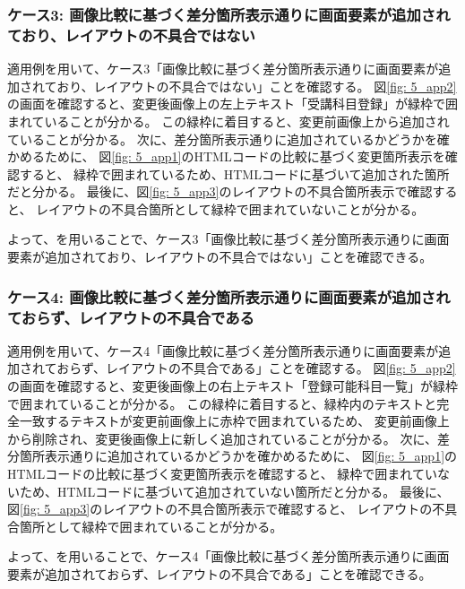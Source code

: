 \subsubsection*{ケース3: 画像比較に基づく差分箇所表示通りに画面要素が追加されており、レイアウトの不具合ではない}\label{sec:result_area3}
適用例を用いて、ケース3「画像比較に基づく差分箇所表示通りに画面要素が追加されており、レイアウトの不具合ではない」ことを確認する。
図\ref{fig: 5_app2}の画面を確認すると、変更後画像上の左上テキスト「受講科目登録」が緑枠で囲まれていることが分かる。
この緑枠に着目すると、変更前画像上から追加されていることが分かる。
次に、差分箇所表示通りに追加されているかどうかを確かめるために、
図\ref{fig: 5_app1}のHTMLコードの比較に基づく変更箇所表示を確認すると、
緑枠で囲まれているため、HTMLコードに基づいて追加された箇所だと分かる。
最後に、図\ref{fig: 5_app3}のレイアウトの不具合箇所表示で確認すると、
レイアウトの不具合箇所として緑枠で囲まれていないことが分かる。
\par
よって、\toolName を用いることで、ケース3「画像比較に基づく差分箇所表示通りに画面要素が追加されており、レイアウトの不具合ではない」ことを確認できる。


\subsubsection*{ケース4: 画像比較に基づく差分箇所表示通りに画面要素が追加されておらず、レイアウトの不具合である}\label{sec:result_area4}
適用例を用いて、ケース4「画像比較に基づく差分箇所表示通りに画面要素が追加されておらず、レイアウトの不具合である」ことを確認する。
図\ref{fig: 5_app2}の画面を確認すると、変更後画像上の右上テキスト「登録可能科目一覧」が緑枠で囲まれていることが分かる。
この緑枠に着目すると、緑枠内のテキストと完全一致するテキストが変更前画像上に赤枠で囲まれているため、
変更前画像上から削除され、変更後画像上に新しく追加されていることが分かる。
次に、差分箇所表示通りに追加されているかどうかを確かめるために、
図\ref{fig: 5_app1}のHTMLコードの比較に基づく変更箇所表示を確認すると、
緑枠で囲まれていないため、HTMLコードに基づいて追加されていない箇所だと分かる。
最後に、図\ref{fig: 5_app3}のレイアウトの不具合箇所表示で確認すると、
レイアウトの不具合箇所として緑枠で囲まれていることが分かる。
\par
よって、\toolName を用いることで、ケース4「画像比較に基づく差分箇所表示通りに画面要素が追加されておらず、レイアウトの不具合である」ことを確認できる。

